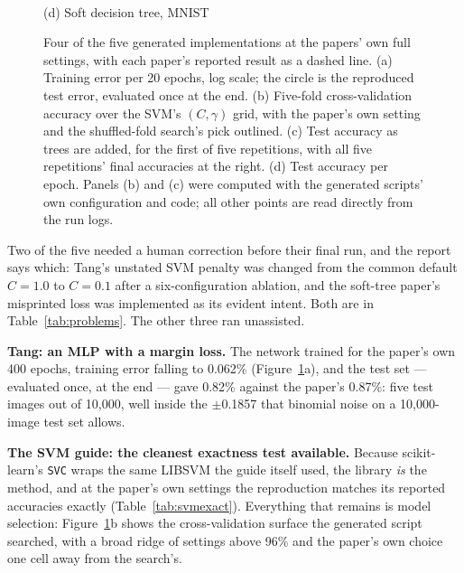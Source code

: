 \documentclass[10pt,twocolumn]{article}
\begin{document}
\begin{figure}[tbp]
\begin{minipage}[t]{0.49\linewidth}
{}\\[-1pt]
{\small (d) Soft decision tree, MNIST}
\end{minipage}
\caption{Four of the five generated implementations at the papers' own full settings, with each
paper's reported result as a dashed line. (a) Training error per 20 epochs, log scale; the circle
is the reproduced test error, evaluated once at the end. (b) Five-fold cross-validation accuracy
over the SVM's $(C, \gamma)$ grid, with the paper's own setting and the shuffled-fold search's
pick outlined. (c) Test accuracy as trees are added, for the first of five repetitions, with all
five repetitions' final accuracies at the right. (d) Test accuracy per epoch. Panels (b) and (c)
were computed with the generated scripts' own configuration and code; all other points are read
directly from the run logs.}
\label{fig:curves}
\end{figure}


Two of the five needed a human correction before their final run, and the report says which:
Tang's unstated SVM penalty was changed from the common default $C = 1.0$ to $C = 0.1$ after a
six-configuration ablation, and the soft-tree paper's misprinted loss was implemented as its
evident intent. Both are in Table~\ref{tab:problems}. The other three ran unassisted.

\textbf{Tang: an MLP with a margin loss.} The network trained for the paper's own 400 epochs,
training error falling to 0.062\% (Figure~\ref{fig:curves}a), and the test set --- evaluated once,
at the end --- gave 0.82\% against the paper's 0.87\%: five test images out of 10{,}000, well
inside the $\pm$0.1857 that binomial noise on a 10{,}000-image test set allows.

\textbf{The SVM guide: the cleanest exactness test available.} Because scikit-learn's
\texttt{SVC} wraps the same LIBSVM the guide itself used, the library \emph{is} the method, and
at the paper's own settings the reproduction matches its reported accuracies exactly
(Table~\ref{tab:svmexact}). Everything that remains is model selection:
Figure~\ref{fig:curves}b shows the cross-validation surface the generated script searched, with a
broad ridge of settings above 96\% and the paper's own choice one cell away from the search's.
\end{document}

